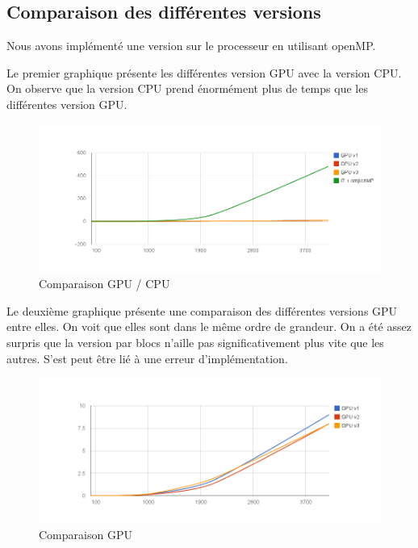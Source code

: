 \documentclass[paper=a4, fontsize=11pt]{scrartcl} %
\numberwithin{equation}{section} %
\numberwithin{figure}{section} %
\numberwithin{table}{section} %
\begin{document}
\subsection{Comparaison des différentes versions}
Nous avons implémenté une version sur le processeur en utilisant
openMP.

Le premier graphique présente les différentes version GPU avec la
version CPU. On observe que la version CPU prend énormément plus de
temps que les différentes version GPU.
\begin{figure}[!h]
  \includegraphics[width=1\textwidth]{chart_1.png}
  \centering
  \caption{Comparaison GPU / CPU}
\end{figure}

Le deuxième graphique présente une comparaison des différentes
versions GPU entre elles. On voit que elles sont dans le même ordre de
grandeur. On a été assez surpris que la version par blocs n'aille pas
significativement plus vite que les autres. S'est peut être lié à une
erreur d'implémentation.

\begin{figure}[!h]
  \includegraphics[width=1\textwidth]{chart_2.png}
  \centering
  \caption{Comparaison GPU}
\end{figure}
\end{document}
